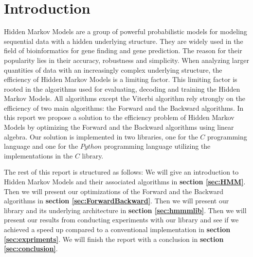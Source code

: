 \section{Introduction}
Hidden Markov Models\cite{baum1966} are a group of powerful probabilistic models for modeling sequential data with a hidden underlying structure. They are widely used in the field of bioinformatics for gene finding and gene prediction. The reason for their popularity lies in their accuracy, robustness and simplicity.
When analyzing larger quantities of data with an increasingly complex underlying structure, the efficiency of Hidden Markov Models is a limiting factor. This limiting factor is rooted in the algorithms used for evaluating, decoding and training the Hidden Markov Models. All algorithms except the Viterbi algorithm rely strongly on the efficiency of two main algorithms: the Forward and the Backward algorithms.
In this report we propose a solution to the efficiency problem of Hidden Markov Models by optimizing the Forward and the Backward algorithms using linear algebra. Our solution is implemented in two libraries, one for the $C$ programming language and one for the $Python$ programming language utilizing the implementations in the $C$ library.

{\small The rest of this report is structured as follows: We will give an introduction to Hidden Markov Models and their associated algorithms in \textbf{section \ref{sec:HMM}}. Then we will present our optimizations of the Forward and the Backward algorithms in \textbf{section \ref{sec:ForwardBackward}}. Then we will present our library and its underlying architecture in \textbf{section \ref{sec:hmmmlib}}. Then we will present our results from conducting experiments with our library and see if we achieved a speed up compared to a conventional implementation in \textbf{section \ref{sec:expriments}}. We will finish the report with a conclusion in \textbf{section \ref{sec:conclusion}}.}
